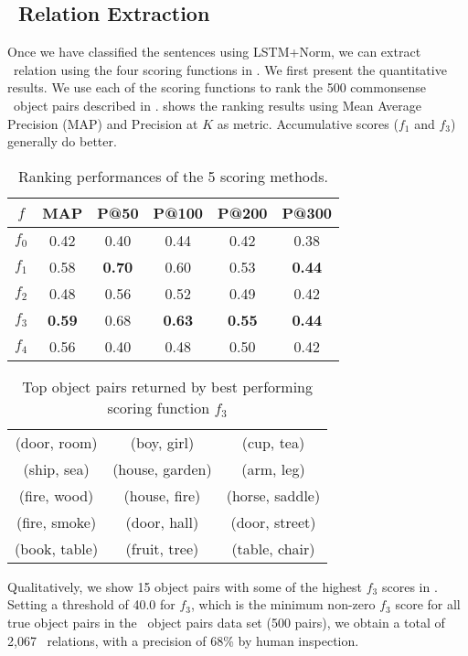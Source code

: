 \subsection{\lnear\ Relation Extraction}
Once we have classified the sentences using LSTM+Norm, we can extract \lnear\
relation using the four scoring functions in .
We first present the quantitative results. 
We use each of the scoring functions to 
rank the 500 commonsense \lnear\ object pairs described in . 
\tabref{tab:3m} shows the ranking results using
Mean Average Precision (MAP) and Precision at $K$ as metric. 
Accumulative scores ($f_1$ and $f_3$) generally do better.
\begin{table}[t]
	\centering
	\small
	\begin{tabular}{|cccccc|}
		\hline
		${f}$	& {MAP} & {P@50} & {P@100}  &  {P@200}& {P@300}\\ \hline
		$f_0$ & 0.42 & 0.40 & 0.44 & 0.42 & 0.38 \\ \hline
		$f_1$	& 0.58  & {\bf 0.70} & 0.60& 0.53 & {\bf 0.44}\\\hline
		$f_2$	& 0.48 & 0.56 & 0.52  & 0.49 & 0.42\\\hline
		$f_3$	& {\bf 0.59} & 0.68& {\bf 0.63} & {\bf 0.55} & {\bf 0.44}\\\hline
		$f_4$	& 0.56 & 0.40 & 0.48 & 0.50 & 0.42\\\hline
	\end{tabular}
	\caption{Ranking performances of the 5 scoring methods.\vspace{-10pt}}
	\label{tab:3m}
\end{table} 
\begin{table}[th!]
\small
	\centering
	\begin{tabular}{|ccc|}
		\hline
		(door, room)  & (boy, girl)     & (cup, tea)      \\
		(ship, sea)   & (house, garden) & (arm, leg)      \\
		(fire, wood)  & (house, fire)   & (horse, saddle) \\
		(fire, smoke) & (door, hall)    & (door, street)  \\
		(book, table) & (fruit, tree)   & (table, chair)  \\ \hline
	\end{tabular}
	\caption{Top object pairs returned by best performing scoring function $f_3$}
	\label{tbl:toppairs}
\end{table} 

Qualitatively, we show 15 object pairs with some of the highest $f_3$ scores
in \tabref{tbl:toppairs}.
Setting a threshold of 40.0 for $f_3$, which is the minimum non-zero
$f_3$ score for all true object pairs in the \lnear\ object pairs 
data set (500 pairs), we obtain a total of 2,067 \lnear\ relations, with
a precision of 68\% by human inspection.

